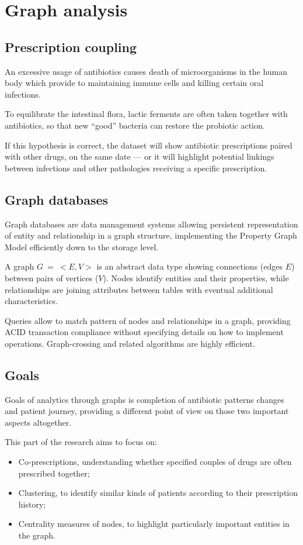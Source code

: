 \chapter{Graph analysis}

\section{Prescription coupling}
An excessive usage of antibiotics causes death of microorganisms in the human body which provide to maintaining immune cells and killing certain oral infections\cite{bacteria}.

To equilibrate the intestinal flora, lactic ferments are often taken together with antibiotics, so that new ``good'' bacteria can restore the probiotic action.

If this hypothesis is correct, the dataset will show antibiotic prescriptions paired with other drugs, on the same date --- or it will highlight potential linkings between infections and other pathologies receiving a specific prescription.

\section{Graph databases}
Graph databases are data management systems allowing persistent representation of entity and relationship in a graph structure, implementing the Property Graph Model efficiently down to the storage level. %

A graph $G\: =\: <E, V>$ is an abstract data type showing connections (edges $E$) between pairs of vertices ($V$). Nodes identify entities and their properties, while relationships are joining attributes between tables with eventual additional characteristics. 

Queries allow to match pattern of nodes and relationships in a graph, providing ACID transaction compliance without specifying details on how to implement operations. Graph-crossing and related algorithms are highly efficient.

\section{Goals}
Goals of analytics through graphs is completion of antibiotic patterns changes and patient journey, providing a different point of view on those two important aspects altogether.

This part of the research aims to focus on:
\begin{itemize}
	\item Co-prescriptions, understanding whether specified couples of drugs are often prescribed together;
	\item Clustering, to identify similar kinds of patients according to their prescription history;
	\item Centrality measures of nodes, to highlight particularly important entities in the graph.
\end{itemize}

